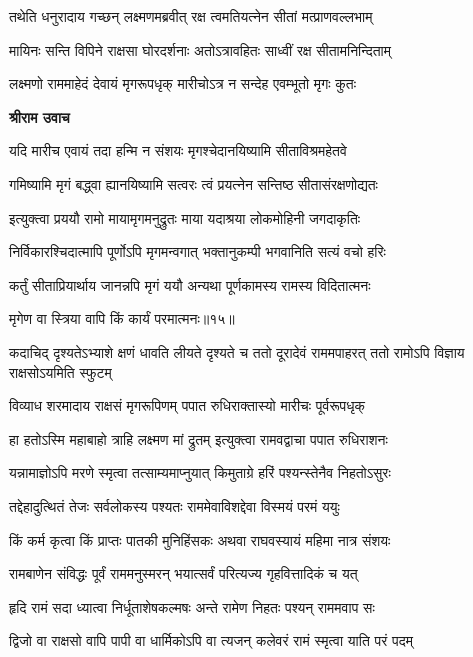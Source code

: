 \twolineshloka
{तथेति धनुरादाय गच्छन् लक्ष्मणमब्रवीत्}
{रक्ष त्वमतियत्नेन सीतां मत्प्राणवल्लभाम्} %

\twolineshloka
{मायिनः सन्ति विपिने राक्षसा घोरदर्शनाः}
{अतोऽत्रावहितः साध्वीं रक्ष सीतामनिन्दिताम्} %

\twolineshloka
{लक्ष्मणो राममाहेदं देवायं मृगरूपधृक्}
{मारीचोऽत्र न सन्देह एवम्भूतो मृगः कुतः} %

\textbf{श्रीराम उवाच}

\twolineshloka
{यदि मारीच एवायं तदा हन्मि न संशयः}
{मृगश्चेदानयिष्यामि सीताविश्रमहेतवे} %

\twolineshloka
{गमिष्यामि मृगं बद्ध्वा ह्यानयिष्यामि सत्वरः}
{त्वं प्रयत्नेन सन्तिष्ठ सीतासंरक्षणोद्यतः} %

\twolineshloka
{इत्युक्त्वा प्रययौ रामो मायामृगमनुद्रुतः}
{माया यदाश्रया लोकमोहिनी जगदाकृतिः} %

\twolineshloka
{निर्विकारश्चिदात्मापि पूर्णोऽपि मृगमन्वगात्}
{भक्तानुकम्पी भगवानिति सत्यं वचो हरिः} %

\twolineshloka
{कर्तुं सीताप्रियार्थाय जानन्नपि मृगं ययौ}
{अन्यथा पूर्णकामस्य रामस्य विदितात्मनः} %

{मृगेण वा स्त्रिया वापि किं कार्यं परमात्मनः॥१५॥} %


\threelineshloka
{कदाचिद् दृश्यतेऽभ्याशे क्षणं धावति लीयते}
{दृश्यते च ततो दूरादेवं राममपाहरत्}
{ततो रामोऽपि विज्ञाय राक्षसोऽयमिति स्फुटम्} %

\twolineshloka
{विव्याध शरमादाय राक्षसं मृगरूपिणम्}
{पपात रुधिराक्तास्यो मारीचः पूर्वरूपधृक्} %

\twolineshloka
{हा हतोऽस्मि महाबाहो त्राहि लक्ष्मण मां द्रुतम्}
{इत्युक्त्वा रामवद्वाचा पपात रुधिराशनः} %

\twolineshloka
{यन्नामाज्ञोऽपि मरणे स्मृत्वा तत्साम्यमाप्नुयात्}
{किमुताग्रे हरिं पश्यन्स्तेनैव निहतोऽसुरः} %

\twolineshloka
{तद्देहादुत्थितं तेजः सर्वलोकस्य पश्यतः}
{राममेवाविशद्देवा विस्मयं परमं ययुः} %

\twolineshloka
{किं कर्म कृत्वा किं प्राप्तः पातकी मुनिहिंसकः}
{अथवा राघवस्यायं महिमा नात्र संशयः} %

\twolineshloka
{रामबाणेन संविद्धः पूर्वं राममनुस्मरन्}
{भयात्सर्वं परित्यज्य गृहवित्तादिकं च यत्} %

\twolineshloka
{हृदि रामं सदा ध्यात्वा निर्धूताशेषकल्मषः}
{अन्ते रामेण निहतः पश्यन् राममवाप सः} %

\twolineshloka
{द्विजो वा राक्षसो वापि पापी वा धार्मिकोऽपि वा}
{त्यजन् कलेवरं रामं स्मृत्वा याति परं पदम्} %

